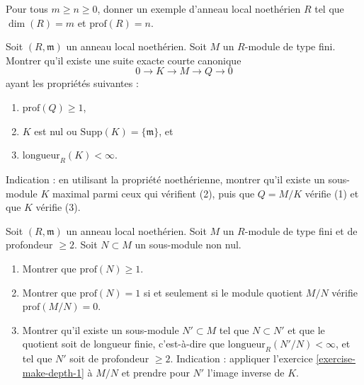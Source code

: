 \begin{exercise}
\label{exercise-depth-examples}
Pour tous $m \geq n \geq 0$, donner un exemple d'anneau local
noethérien $R$ tel que $\dim(R) = m$ et $\text{prof}(R) = n$.
\end{exercise}

\begin{exercise}
\label{exercise-make-depth-1}
Soit $(R, \mathfrak m)$ un anneau local noethérien.
Soit $M$ un $R$-module de type fini.
Montrer qu'il existe une suite exacte courte canonique
$$
0 \to K \to M \to Q \to 0
$$
ayant les propriétés suivantes :
\begin{enumerate}
\item $\text{prof}(Q) \geq 1$,
\item $K$ est nul ou $\text{Supp}(K) = \{\mathfrak m\}$, et
\item $\text{longueur}_R(K) < \infty$.
\end{enumerate}
Indication : en utilisant la propriété noethérienne, montrer qu'il
existe un sous-module $K$ maximal parmi ceux qui vérifient (2),
puis que $Q = M/K$ vérifie (1) et que $K$ vérifie (3).
\end{exercise}

\begin{exercise}
\label{exercise-make-depth-2}
Soit $(R, \mathfrak m)$ un anneau local noethérien.
Soit $M$ un $R$-module de type fini et de profondeur $\geq 2$.
Soit $N \subset M$ un sous-module non nul.
\begin{enumerate}
\item Montrer que $\text{prof}(N) \geq 1$.
\item Montrer que $\text{prof}(N) = 1$ si et seulement si le
module quotient $M/N$ vérifie $\text{prof}(M/N) = 0$.
\item Montrer qu'il existe un sous-module $N' \subset M$ tel que
$N \subset N'$ et que le quotient soit de longueur finie, c'est-à-dire que
$\text{longueur}_R(N'/N) < \infty$, et tel que $N'$ soit
de profondeur $\geq 2$. Indication : appliquer l'exercice \ref{exercise-make-depth-1} à $M/N$
et prendre pour $N'$ l'image inverse de $K$.
\end{enumerate}
\end{exercise}

